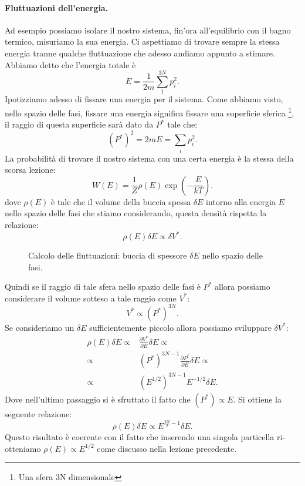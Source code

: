 \paragraph{Fluttuazioni dell'energia.}%
Ad esempio possiamo isolare il nostro sistema, fin'ora all'equilibrio con il bagno termico, misuriamo la sua energia. Ci aspettiamo di trovare sempre la stessa energia tranne qualche fluttuazione che adesso andiamo appunto a stimare. \\
Abbiamo detto che l'energia totale è
\[
	E = \frac{1}{2m}\sum_{1}^{3N} p_{i}^2
.\] 
Ipotizziamo adesso di fissare una energia per il sistema. Come abbiamo visto, nello spazio delle fasi, fissare una energia significa fissare una superficie sferica \footnote{Una sfera 3N dimensionale}, il raggio di questa superficie sarà dato da $P^{*}$ tale che:
\[
	\left( P^* \right)^2 = 2mE = \sum_{i}^{} p_{i}^2
.\] 
La probabilità di trovare il nostro sistema con una certa energia è la stessa della scorsa lezione:
\[
	W\left( E \right) = \frac{1}{Z}\rho\left( E \right) \exp\left( -\frac{E}{kT} \right) 
.\] 
dove $\rho\left( E \right)$ è tale che il volume della buccia spessa $\delta E$ intorno alla energia $E$ nello spazio delle fasi che stiamo considerando, questa densità rispetta la relazione:
\[
	\rho\left( E \right) \delta E \propto \delta V^*
.\]
\begin{figure}[H]
    \centering
    \caption{Calcolo delle fluttuazioni: buccia di spessore $\delta E$ nello spazio delle fasi.}
    \label{fig:calcolo-delle-fluttuazioni}
\end{figure}
\noindent
Quindi se il raggio di tale sfera nello spazio delle fasi è $P^*$ allora possiamo considerare il volume sotteso a tale raggio come  $V^{*}$:
\[
	V^* \propto \left( P^* \right)^{3N}
.\] 
Se consideriamo un $\delta E$ sufficientemente piccolo allora possiamo sviluppare $\delta V^{*}$:
\begin{align}
	\rho\left( E \right) \delta E \propto& \frac{\partial V^*}{\partial E}\delta E  \propto\\
	\propto &\left( P^* \right) ^{3N-1}\frac{\partial P^*}{\partial E} \delta E \propto\\
	\propto &\left( E^{1 / 2} \right) ^{3N-1}E^{- 1 / 2} \delta E
.\end{align}
Dove nell'ultimo passaggio si è sfruttato il fatto che $\left( P^{*} \right) \propto E$. Si ottiene la seguente relazione: 
\[
	\rho\left( E \right) \delta E \propto E ^{\frac{3N}{2} -1}\delta E 
.\] 
Questo risultato è coerente con il fatto che inserendo una singola particella ri-otteniamo $\rho\left( E \right) \propto E^{1 /2}$ come discusso nella lezione precedente.\\
